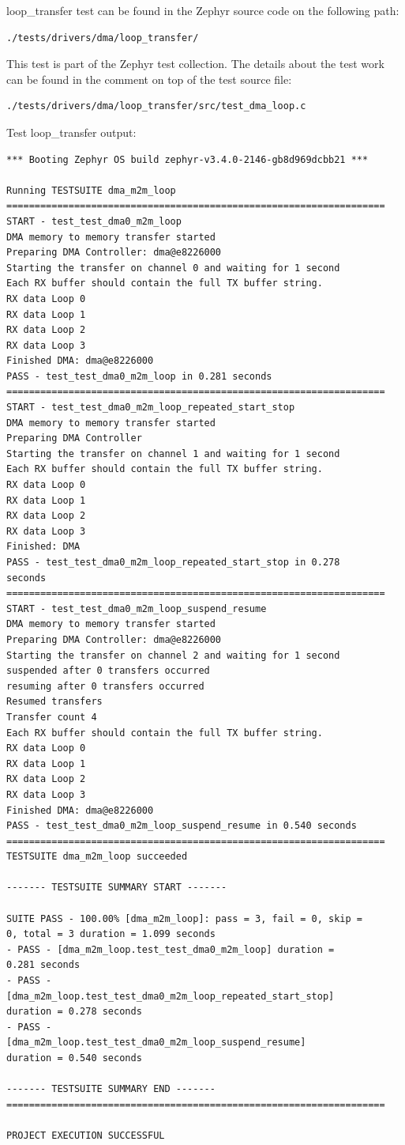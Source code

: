 \documentclass[11pt,a4paper,oneside]{article}
\begin{document}
loop\_transfer test can be found in the Zephyr source code on the
following path:

\begin{lstlisting}
./tests/drivers/dma/loop_transfer/
\end{lstlisting}

This test is part of the Zephyr test collection. The details about the
test work can be found in the comment on top of the test source file:
\begin{lstlisting}
./tests/drivers/dma/loop_transfer/src/test_dma_loop.c
\end{lstlisting}

Test loop\_transfer output:

\begin{lstlisting}
*** Booting Zephyr OS build zephyr-v3.4.0-2146-gb8d969dcbb21 ***

Running TESTSUITE dma_m2m_loop
===================================================================
START - test_test_dma0_m2m_loop
DMA memory to memory transfer started
Preparing DMA Controller: dma@e8226000
Starting the transfer on channel 0 and waiting for 1 second
Each RX buffer should contain the full TX buffer string.
RX data Loop 0
RX data Loop 1
RX data Loop 2
RX data Loop 3
Finished DMA: dma@e8226000
PASS - test_test_dma0_m2m_loop in 0.281 seconds
===================================================================
START - test_test_dma0_m2m_loop_repeated_start_stop
DMA memory to memory transfer started
Preparing DMA Controller
Starting the transfer on channel 1 and waiting for 1 second
Each RX buffer should contain the full TX buffer string.
RX data Loop 0
RX data Loop 1
RX data Loop 2
RX data Loop 3
Finished: DMA
PASS - test_test_dma0_m2m_loop_repeated_start_stop in 0.278
seconds
===================================================================
START - test_test_dma0_m2m_loop_suspend_resume
DMA memory to memory transfer started
Preparing DMA Controller: dma@e8226000
Starting the transfer on channel 2 and waiting for 1 second
suspended after 0 transfers occurred
resuming after 0 transfers occurred
Resumed transfers
Transfer count 4
Each RX buffer should contain the full TX buffer string.
RX data Loop 0
RX data Loop 1
RX data Loop 2
RX data Loop 3
Finished DMA: dma@e8226000
PASS - test_test_dma0_m2m_loop_suspend_resume in 0.540 seconds
===================================================================
TESTSUITE dma_m2m_loop succeeded

------- TESTSUITE SUMMARY START -------

SUITE PASS - 100.00% [dma_m2m_loop]: pass = 3, fail = 0, skip =
0, total = 3 duration = 1.099 seconds
- PASS - [dma_m2m_loop.test_test_dma0_m2m_loop] duration =
0.281 seconds
- PASS -
[dma_m2m_loop.test_test_dma0_m2m_loop_repeated_start_stop]
duration = 0.278 seconds
- PASS -
[dma_m2m_loop.test_test_dma0_m2m_loop_suspend_resume]
duration = 0.540 seconds

------- TESTSUITE SUMMARY END -------
===================================================================

PROJECT EXECUTION SUCCESSFUL
\end{lstlisting}
\end{document}
